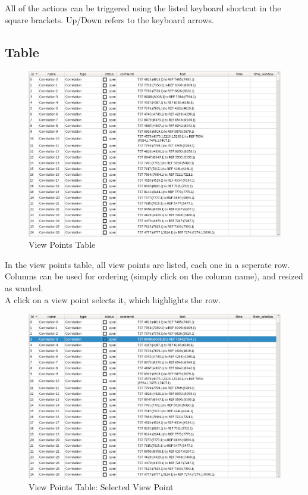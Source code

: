 All of the actions can be triggered using the listed keyboard shortcut in the square brackets. Up/Down refers to the keyboard arrows.

\subsection{Table}

\begin{figure}[H]
    \hspace*{-2cm}
    \includegraphics[width=18cm,frame]{figures/view_points_table.png}
  \caption{View Points Table}
\end{figure}

In the view points table, all view points are listed, each one in a seperate row. Columns can be used for ordering (simply click on the column name), and resized as wanted. \\

A click on a view point selects it, which highlights the row.

\begin{figure}[H]
    \hspace*{-2cm}
    \includegraphics[width=18cm,frame]{figures/view_points_table_selected.png}
  \caption{View Points Table: Selected View Point}
\end{figure}

